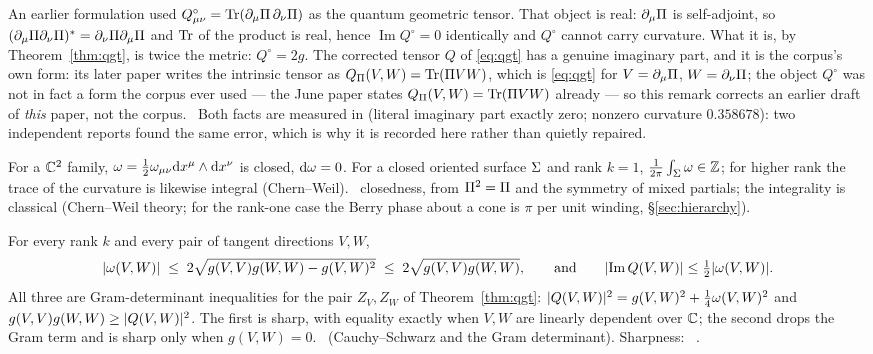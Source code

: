 \begin{remark}\label{rem:qgt-correction}
An earlier formulation used $Q^\circ_{\mu\nu}=\operatorname{Tr}(\partial_\mu\Pi\,\partial_\nu\Pi)$ as the
quantum geometric tensor. That object is real: $\partial_\mu\Pi$ is self-adjoint, so
$(\partial_\mu\Pi\partial_\nu\Pi)^*=\partial_\nu\Pi\partial_\mu\Pi$ and $\operatorname{Tr}$ of the product is
real, hence $\operatorname{Im}Q^\circ=0$ identically and $Q^\circ$ cannot carry curvature. What
it is, by Theorem~\ref{thm:qgt}, is twice the metric: $Q^\circ=2g$. The corrected tensor $Q$ of
\eqref{eq:qgt} has a genuine imaginary part, and it is the corpus's own form: its later paper
\Cc{} \cite{iqgt} writes the intrinsic tensor as $Q_{\Pi}(V,W)=\operatorname{Tr}(\Pi VW)$, which is
\eqref{eq:qgt} for $V=\partial_\mu\Pi$, $W=\partial_\nu\Pi$; the object $Q^\circ$ was not in fact
a form the corpus ever used --- the June paper states $Q_\Pi(V,W)=\operatorname{Tr}(\Pi VW)$ already --- so
this remark corrects an earlier draft of \emph{this} paper, not the corpus. \V\ Both facts are measured in
 (literal imaginary part exactly zero; nonzero curvature
$0.358678$): two independent reports found the same error, which is why it is recorded here
rather than quietly repaired.
\end{remark}

\begin{theorem}\label{thm:curv}
For a $\mathbb{C}^2$ family, $\omega=\tfrac12\omega_{\mu\nu}\mathrm{d} x^\mu\wedge\mathrm{d} x^\nu$ is closed,
$\mathrm{d}\omega=0$. For a closed oriented surface $\Sigma$ and rank $k=1$,
$\frac1{2\pi}\int_\Sigma\omega\in\mathbb{Z}$; for higher rank the trace of the curvature is
likewise integral (Chern--Weil). \T\ closedness, from $\Pi^2=\Pi$ and the symmetry of mixed
partials; the integrality is classical \Cc{} (Chern--Weil theory; for the rank-one case the
Berry phase about a cone is $\pi$ per unit winding, \S\ref{sec:hierarchy}).
\end{theorem}

\begin{theorem}\label{thm:bound}
For every rank $k$ and every pair of tangent directions $V,W$,
\begin{equation}\label{eq:bound}
   \lvert\omega(V,W)\rvert\;\le\;2\sqrt{g(V,V)g(W,W)-g(V,W)^{2}}\;\le\;2\sqrt{g(V,V)g(W,W)} ,
   \qquad\text{and}\qquad \lvert\operatorname{Im}Q(V,W)\rvert\le\tfrac12\lvert\omega(V,W)\rvert .
\end{equation}
All three are Gram-determinant inequalities for the pair $Z_V,Z_W$ of
Theorem~\ref{thm:qgt}: $\lvert Q(V,W)\rvert^2=g(V,W)^2+\tfrac14\omega(V,W)^2$ and
$g(V,V)g(W,W)\ge\lvert Q(V,W)\rvert^2$. The first is sharp, with equality exactly when $V,W$ are
linearly dependent over $\mathbb{C}$; the second drops the Gram term and is sharp only when $g(V,W)=0$.
\T\ (Cauchy--Schwarz and the Gram determinant). Sharpness: \V\
.
\end{theorem}

